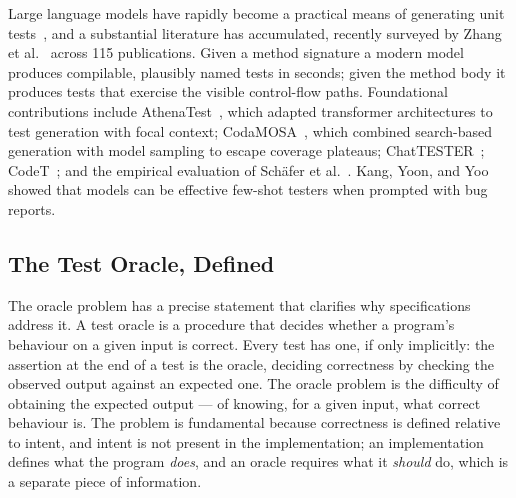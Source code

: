 Large language models have rapidly become a practical means of generating unit
tests~\cite{schafer2023adaptive, chen2022codet, yuan2024chattester,
lemieux2023codamosa, chen2021codex}, and a substantial literature has
accumulated, recently surveyed by Zhang et al.~\cite{zhang2025llmunitsurvey}
across 115 publications. Given a method signature a modern model produces
compilable, plausibly named tests in seconds; given the method body it
produces tests that exercise the visible control-flow paths. Foundational
contributions include AthenaTest~\cite{tufano2020athenatest}, which adapted
transformer architectures to test generation with focal context;
CodaMOSA~\cite{lemieux2023codamosa}, which combined search-based generation
with model sampling to escape coverage plateaus; ChatTESTER~\cite{yuan2024chattester};
CodeT~\cite{chen2022codet}; and the empirical evaluation of Sch\"afer et
al.~\cite{schafer2023adaptive}. Kang, Yoon, and Yoo~\cite{kang2023libro}
showed that models can be effective few-shot testers when prompted with bug
reports.

\subsection{The Test Oracle, Defined}

The oracle problem has a precise statement that clarifies why specifications
address it. A test oracle is a procedure that decides whether a program's
behaviour on a given input is correct. Every test has one, if only implicitly:
the assertion at the end of a test is the oracle, deciding correctness by checking
the observed output against an expected one. The oracle problem is the difficulty
of obtaining the expected output --- of knowing, for a given input, what correct
behaviour is. The problem is fundamental because correctness is defined relative to
intent, and intent is not present in the implementation; an implementation defines
what the program \emph{does}, and an oracle requires what it \emph{should} do,
which is a separate piece of information.

